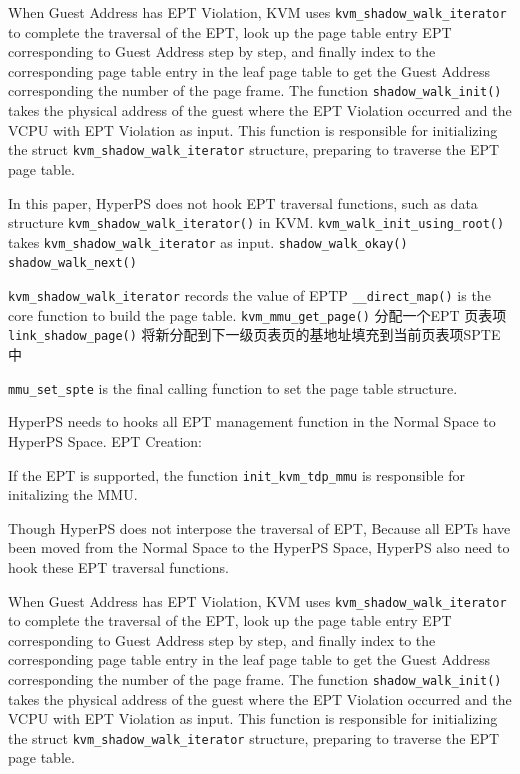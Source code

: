 When Guest Address has EPT Violation, KVM uses \verb|kvm_shadow_walk_iterator| to complete the traversal of the EPT, look up the page table entry EPT corresponding to Guest Address step by step, and finally index to the corresponding page table entry in the leaf page table to get the Guest Address corresponding the number of the page frame.
The function \verb|shadow_walk_init()| takes the physical address of the guest where the EPT Violation occurred and the VCPU with EPT Violation as input. 
This function is responsible for initializing the struct \verb|kvm_shadow_walk_iterator| structure, preparing to traverse the EPT page table.

In this paper, HyperPS does not hook EPT traversal functions, such as data structure \verb|kvm_shadow_walk_iterator()| in KVM. 
\verb|kvm_walk_init_using_root()| takes \verb|kvm_shadow_walk_iterator| as input. 
\verb|shadow_walk_okay()| \verb|shadow_walk_next()|

\verb|kvm_shadow_walk_iterator| records the value of EPTP
\fi
\iffalse
\verb|__direct_map()| is the core function to build the page table.
\verb|kvm_mmu_get_page()| 分配一个EPT 页表项 
\verb|link_shadow_page()| 将新分配到下一级页表页的基地址填充到当前页表项SPTE中

\verb|mmu_set_spte| is the final calling function to set the page table structure. 

HyperPS needs to hooks all EPT management function in the Normal Space to HyperPS Space. 
EPT Creation: 

If the EPT is supported, the function \verb|init_kvm_tdp_mmu| is responsible for initalizing the MMU. 

Though HyperPS does not interpose the traversal of EPT, Because all EPTs have been moved from the Normal Space to the HyperPS Space, HyperPS also need to hook these EPT traversal functions. 

When Guest Address has EPT Violation, KVM uses \verb|kvm_shadow_walk_iterator| to complete the traversal of the EPT, look up the page table entry EPT corresponding to Guest Address step by step, and finally index to the corresponding page table entry in the leaf page table to get the Guest Address corresponding the number of the page frame.
The function \verb|shadow_walk_init()| takes the physical address of the guest where the EPT Violation occurred and the VCPU with EPT Violation as input. 
This function is responsible for initializing the struct \verb|kvm_shadow_walk_iterator| structure, preparing to traverse the EPT page table.

